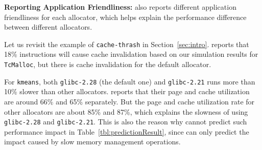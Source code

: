 
\textbf{Reporting Application Friendliness:} 
\MP{} also reports different application friendliness for each allocator, which helps explain the performance difference between different allocators. 

Let us revisit the example of \texttt{cache-thrash} in Section~\ref{sec:intro}. \MP{} reports that 18\% instructions will cause cache invalidation based on our simulation results for \texttt{TcMalloc}, but there is  cache invalidation for the default allocator. 


For \texttt{kmeans}, both \texttt{glibc-2.28} (the default one) and \texttt{glibc-2.21} runs more than  10\% slower than other allocators. \MP{} reports that their page and cache utilization are around 66\% and 65\% separately. But the page and cache utilization rate for other allocators are about 85\% and 87\%, which explains the slowness of using \texttt{glibc-2.28}  and \texttt{glibc-2.21}. This is also the reason why \MP{} cannot predict such performance impact in Table~\ref{tbl:predictionResult}, since \MP{} can only predict the impact caused by slow memory management operations. 




